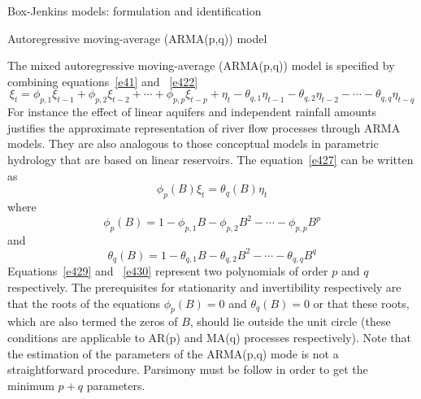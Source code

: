 \documentclass[8pt]{beamer}
\renewcommand{\emph}[1]{\textcolor{myorange}{#1}}
\begin{document}
\begin{frame}{Box-Jenkins models: formulation and identification}
    \begin{block}{Autoregressive moving-average (ARMA(p,q)) model}
    \end{block}
     The mixed \alert{autoregressive moving-average (ARMA(p,q)) model} is specified by combining equations~\ref{e41} and ~\ref{e422}   
     \begin{equation}
            \xi_t = \phi_{p,1} \xi_{t-1} + \phi_{p,2} \xi_{t-2} + \cdots + \phi_{p,p} \xi_{t-p} + \eta_t - \theta_{q,1} \eta_{t-1} - \theta_{q,2} \eta_{t-2}-\cdots- \theta_{q,q} \eta_{t-q} 
            \label{e427}
        \end{equation}
        For instance the effect of \emph{linear aquifers} and \emph{independent rainfall} amounts justifies the approximate representation of \emph{river flow processes} through \emph{ARMA} models. They are also analogous to those \emph{conceptual models} in \emph{parametric hydrology} that are based on \emph{linear reservoirs}. The equation~\ref{e427} can be written as
        \begin{equation}
            \phi_p (B) \xi_t = \theta_q (B) \eta_t
            \label{e428}
        \end{equation}
        where 
        \begin{equation}
            \phi_p (B) = 1- \phi_{p,1} B - \phi_{p,2} B^2 - \cdots - \phi_{p,p} B^p
            \label{e429}
        \end{equation}
        and
        \begin{equation}
            \theta_q (B) = 1- \theta_{q,1} B - \theta_{q,2} B^2 - \cdots - \theta_{q,q} B^q
            \label{e430}
        \end{equation}
        Equations~\ref{e429} and ~\ref{e430} represent two polynomials of order $p$ and $q$ respectively. The prerequisites for \emph{stationarity} and \emph{invertibility}  respectively are that the roots of the equations $\phi_p (B) =0$ and $\theta_q (B) =0$ or that these roots, which are also termed the zeros of $B$, should lie \emph{outside} the \emph{unit circle} (these conditions are applicable to \emph{AR(p)} and \emph{MA(q)} processes respectively). Note that the estimation of the parameters of the \emph{ARMA(p,q)} mode is not a straightforward procedure. \alert{Parsimony} must be follow in order to get the minimum $p+q$ parameters. 
\end{frame}
 
\end{document}
